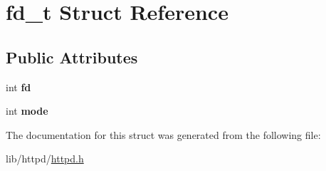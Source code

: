 \hypertarget{structfd__t}{}\section{fd\+\_\+t Struct Reference}
\label{structfd__t}
\subsection*{Public Attributes}
\begin{DoxyCompactItemize}
\item 
\mbox{\label{structfd__t_a202e5b3abfffce509eeae0035a40bb0e}} 
int {\bfseries fd}
\item 
\mbox{\label{structfd__t_ac051505ddc0ed97d122a4cf23e2f5eb9}} 
int {\bfseries mode}
\end{DoxyCompactItemize}


The documentation for this struct was generated from the following file\+:\begin{DoxyCompactItemize}
\item 
lib/httpd/\hyperlink{httpd_8h}{httpd.\+h}\end{DoxyCompactItemize}
